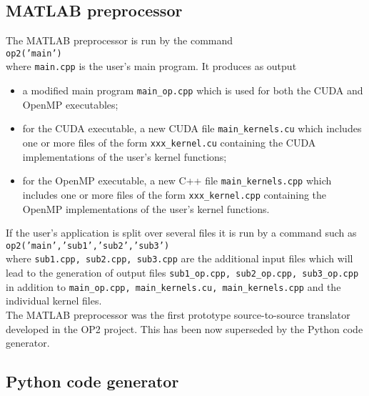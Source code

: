 \documentclass[11pt]{article}
\begin{document}
\subsection{MATLAB preprocessor}
The MATLAB preprocessor is run by the command\\

{\tt op2('main')}\\

\noindent
where {\tt main.cpp} is the user's main program.  It produces as output
\begin{itemize}
\item
a modified main program {\tt main\_op.cpp} which is used for both the
CUDA and OpenMP executables;
\item
for the CUDA executable, a new CUDA file {\tt main\_kernels.cu} which
includes one or more files of the form {\tt xxx\_kernel.cu} containing
the CUDA implementations of the user's kernel functions;
\item
for the OpenMP executable, a new C++ file {\tt main\_kernels.cpp} which
includes one or more files of the form {\tt xxx\_kernel.cpp} containing
the OpenMP implementations of the user's kernel functions.
\end{itemize}

\noindent
If the user's application is split over several files it is run by a command such as\\

{\tt op2('main','sub1','sub2','sub3')}\\

\noindent
where {\tt sub1.cpp, sub2.cpp, sub3.cpp} are the additional input files which will
lead to the generation of output files {\tt sub1\_op.cpp, sub2\_op.cpp, sub3\_op.cpp}
in addition to {\tt main\_op.cpp, main\_kernels.cu, main\_kernels.cpp}
and the individual kernel files.\\

\noindent
The MATLAB preprocessor was the first prototype source-to-source translator developed in the OP2 project. This has been
now superseded by the Python code generator.


\subsection{Python code generator}
\end{document}
